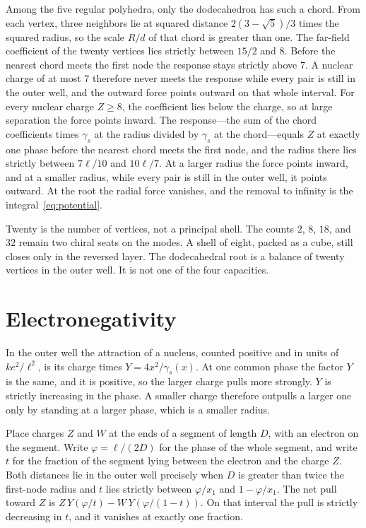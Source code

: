 \documentclass[a4paper]{article}
\begin{document}
Among the five regular polyhedra, only the dodecahedron has such a chord. From each vertex, three neighbors lie at squared distance \(2(3-\sqrt{5})/3\) times the squared radius, so the scale \(R/d\) of that chord is greater than one. The far-field coefficient of the twenty vertices lies strictly between \(15/2\) and \(8\). Before the nearest chord meets the first node the response stays strictly above \(7\). A nuclear charge of at most \(7\) therefore never meets the response while every pair is still in the outer well, and the outward force points outward on that whole interval. For every nuclear charge \(Z\ge 8\), the coefficient lies below the charge, so at large separation the force points inward. The response---the sum of the chord coefficients times \(\gamma_s\) at the radius divided by \(\gamma_s\) at the chord---equals \(Z\) at exactly one phase before the nearest chord meets the first node, and the radius there lies strictly between \(7\ell/10\) and \(10\ell/7\). At a larger radius the force points inward, and at a smaller radius, while every pair is still in the outer well, it points outward. At the root the radial force vanishes, and the removal to infinity is the integral~\eqref{eq:potential}.

Twenty is the number of vertices, not a principal shell. The counts \(2\), \(8\), \(18\), and \(32\) remain two chiral seats on the modes. A shell of eight, packed as a cube, still closes only in the reversed layer. The dodecahedral root is a balance of twenty vertices in the outer well. It is not one of the four capacities.

\section{Electronegativity}
\label{sec:eneg}

In the outer well the attraction of a nucleus, counted positive and in units of \(k e^{2}/\ell^{2}\), is its charge times \(Y=4x^{2}/\gamma_s(x)\). At one common phase the factor \(Y\) is the same, and it is positive, so the larger charge pulls more strongly. \(Y\) is strictly increasing in the phase. A smaller charge therefore outpulls a larger one only by standing at a larger phase, which is a smaller radius.

Place charges \(Z\) and \(W\) at the ends of a segment of length \(D\), with an electron on the segment. Write \(\varphi=\ell/(2D)\) for the phase of the whole segment, and write \(t\) for the fraction of the segment lying between the electron and the charge \(Z\). Both distances lie in the outer well precisely when \(D\) is greater than twice the first-node radius and \(t\) lies strictly between \(\varphi/x_1\) and \(1-\varphi/x_1\). The net pull toward \(Z\) is \(Z\,Y(\varphi/t)-W\,Y(\varphi/(1-t))\). On that interval the pull is strictly decreasing in \(t\), and it vanishes at exactly one fraction.
\end{document}
